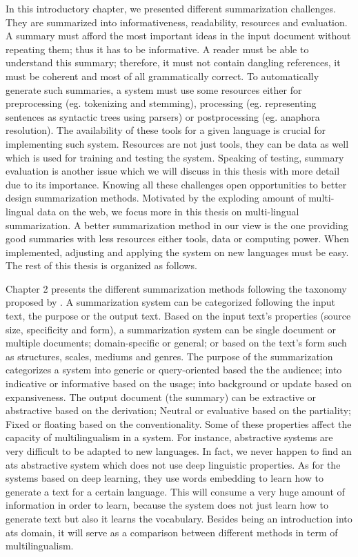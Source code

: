 In this introductory chapter, we presented different summarization challenges. 
They are summarized into informativeness, readability, resources and evaluation. 
A summary must afford the most important ideas in the input document without repeating them; thus it has to be informative. 
A reader must be able to understand this summary; therefore, it must not contain dangling references, it must be coherent and most of all grammatically correct. 
To automatically generate such summaries, a system must use some resources either for preprocessing (eg. tokenizing and stemming), processing (eg. representing sentences as syntactic trees using parsers) or postprocessing (eg. anaphora resolution).
The availability of these tools for a given language is crucial for implementing such system. 
Resources are not just tools, they can be data as well which is used for training and testing the system. 
Speaking of testing, summary evaluation is another issue which we will discuss in this thesis with more detail due to its importance. 
Knowing all these challenges open opportunities to better design summarization methods.
Motivated by the exploding amount of multi-lingual data on the web, we focus more in this thesis on multi-lingual summarization.
A better summarization method in our view is the one providing good summaries with less resources either tools, data or computing power. 
When implemented, adjusting and applying the system on new languages must be easy.
The rest of this thesis is organized as follows.

Chapter 2 presents the different summarization methods following the taxonomy proposed by \citet{98-hovy-lin,99-sparckjones}. 
A summarization system can be categorized following the input text, the purpose or the output text. 
Based on the input text's properties (source size, specificity and form), a summarization system can be single document or multiple documents; domain-specific or general; or based on the text's form such as structures, scales, mediums and
genres. 
The purpose of the summarization categorizes a system into generic or query-oriented based the the audience; into indicative or informative based on the usage; into background or update based on expansiveness.
The output document (the summary) can be extractive or abstractive based on the derivation; Neutral or evaluative based on the partiality; Fixed or floating based on the conventionality. 
Some of these properties affect the capacity of multilingualism in a system. 
For instance, abstractive systems are very difficult to be adapted to new languages. 
In fact, we never happen to find an \ac{ats} abstractive system which does not use deep linguistic properties. 
As for the systems based on deep learning, they use words embedding to learn how to generate a text for a certain language. 
This will consume a very huge amount of information in order to learn, because the system does not just learn how to generate text but also it learns the vocabulary.  
Besides being an introduction into \ac{ats} domain, it will serve as a comparison between different methods in term of multilingualism.



